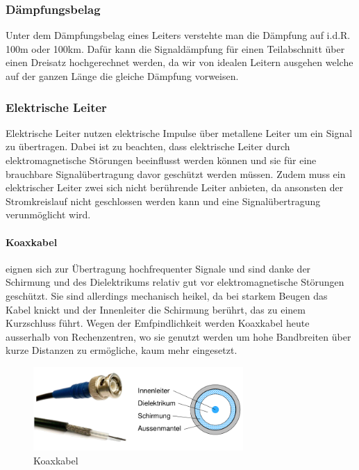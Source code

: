 \documentclass{article}
\begin{document}
\subsubsection{Dämpfungsbelag}
Unter dem Dämpfungsbelag eines Leiters verstehte man die Dämpfung auf i.d.R. 100m oder 100km. Dafür kann die Signaldämpfung für einen Teilabschnitt über einen Dreisatz hochgerechnet werden, da wir von idealen Leitern ausgehen welche auf der ganzen Länge die gleiche Dämpfung vorweisen.
\newpage
\subsubsection{Elektrische Leiter}
Elektrische Leiter nutzen elektrische Impulse über metallene Leiter um ein Signal zu übertragen. Dabei ist zu beachten, dass elektrische Leiter durch elektromagnetische Störungen beeinflusst werden können und sie für eine brauchbare Signalübertragung davor geschützt werden müssen. Zudem muss ein elektrischer Leiter zwei sich nicht berührende Leiter anbieten, da ansonsten der Stromkreislauf nicht geschlossen werden kann und eine Signalübertragung verunmöglicht wird.
\paragraph{Koaxkabel}
eignen sich zur Übertragung hochfrequenter Signale und sind danke der Schirmung und des Dielektrikums relativ gut vor elektromagnetische Störungen geschützt. Sie sind allerdings mechanisch heikel, da bei starkem Beugen das Kabel knickt und der Innenleiter die Schirmung berührt, das zu einem Kurzschluss führt. Wegen der Emfpindlichkeit werden Koaxkabel heute ausserhalb von Rechenzentren, wo sie genutzt werden um hohe Bandbreiten über kurze Distanzen zu ermögliche, kaum mehr eingesetzt.
\begin{figure}[h!]
		\begin{center}
		\includegraphics[width=8cm]{img/koax.png}
		\end{center}
		\caption{Koaxkabel}
		\label{fig:Koaxkabel}
\end{figure}
\end{document}
